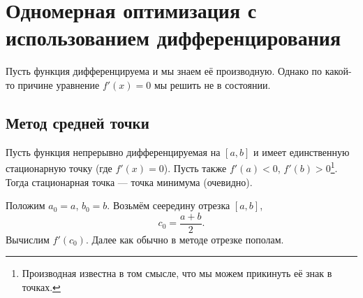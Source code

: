 \section{Одномерная оптимизация с использованием дифференцирования}
Пусть функция дифференцируема и мы знаем её производную. Однако по какой-то
причине уравнение $ f'(x) = 0 $ мы решить не в состоянии.
\subsection{Метод средней точки}

Пусть функция непрерывно дифференцируемая на $ [a,b] $ и имеет единственную
стационарную точку (где $ f'(x) = 0 $). Пусть также $ f'(a) <0 $, $ f'(b) > 0
$\footnote{Производная известна в том смысле, что мы можем прикинуть её знак в
точках.}. Тогда стационарная точка --- точка минимума (очевидно).

Положим $ a_0 = a $, $ b_0 = b $. Возьмём сеередину отрезка $ [a, b] $,  
\[
    c_0 = \frac{a+b}{2}.
\]
Вычислим $ f'(c_0) $. Далее как обычно в методе отрезке пополам.


